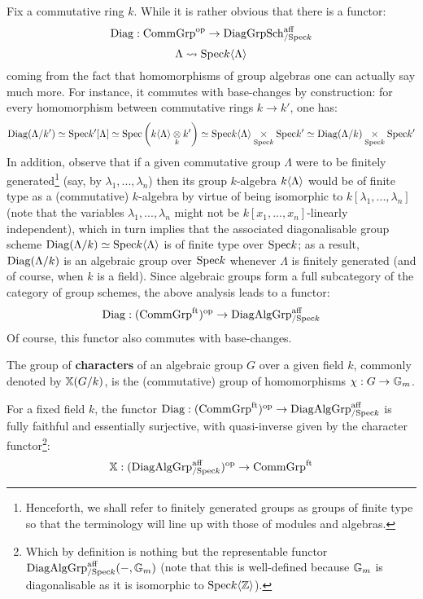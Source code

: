             \begin{remark} \label{remark: diagonalisable_algebraic_groups}
                Fix a commutative ring $k$. While it is rather obvious that there is a functor:
                    $$\mathrm{Diag}: \mathrm{Comm}\mathrm{Grp}^{\mathrm{op}} \to \mathrm{Diag}\mathrm{Grp}\mathrm{Sch}^{\mathrm{aff}}_{/\mathrm{Spec} k}$$
                    $$\Lambda \leadsto \mathrm{Spec} k\langle\Lambda\rangle$$
                coming from the fact that homomorphisms of group algebras one can actually say much more. For instance, it commutes with base-changes by construction: for every homomorphism between commutative rings $k \to k'$, one has:
                    $$\Diag(\Lambda/k') \cong \Spec k'[\Lambda] \cong \Spec \left(k\<\Lambda\> \tensor_k k'\right) \cong \Spec k\<\Lambda\> \x_{\Spec k} \Spec k' \cong \Diag(\Lambda/k) \x_{\Spec k} \Spec k'$$
                In addition, observe that if a given commutative group $\Lambda$ were to be finitely generated\footnote{Henceforth, we shall refer to finitely generated groups as groups of finite type so that the terminology will line up with those of modules and algebras.} (say, by $\lambda_1, ..., \lambda_n$) then its group $k$-algebra $k\langle\Lambda\rangle$ would be of finite type as a (commutative) $k$-algebra by virtue of being isomorphic to $k[\lambda_1, ..., \lambda_n]$ (note that the variables $\lambda_1, ..., \lambda_n$ might not be $k[x_1, ..., x_n]$-linearly independent), which in turn implies that the associated diagonalisable group scheme $\mathrm{Diag}(\Lambda/k) \simeq \mathrm{Spec} k\langle\Lambda\rangle$ is of finite type over $\mathrm{Spec} k$; as a result, $\mathrm{Diag}(\Lambda/k)$ is an algebraic group over $\mathrm{Spec} k$ whenever $\Lambda$ is finitely generated (and of course, when $k$ is a field). Since algebraic groups form a full subcategory of the category of group schemes, the above analysis leads to a functor:
                    $$\mathrm{Diag}: (\mathrm{Comm}\mathrm{Grp}^{\mathrm{ft}})^{\mathrm{op}} \to \mathrm{Diag}\mathrm{Alg}\mathrm{Grp}^{\mathrm{aff}}_{/\mathrm{Spec} k}$$
                Of course, this functor also commutes with base-changes. 
            \end{remark}
            \begin{definition}[Characters] \label{def: characters_of_algebraic_groups}
                The group of \textbf{characters} of an algebraic group $G$ over a given field $k$, commonly denoted by $\mathbb{X}(G/k)$, is the (commutative) group of homomorphisms $\chi: G \to \mathbb{G}_m$.
            \end{definition}
            \begin{proposition} \label{prop: pontryagin_duality_for_algebraic_groups}
                For a fixed field $k$, the functor $\mathrm{Diag}: (\mathrm{Comm}\mathrm{Grp}^{\mathrm{ft}})^{\mathrm{op}} \to \mathrm{Diag}\mathrm{Alg}\mathrm{Grp}^{\mathrm{aff}}_{/\mathrm{Spec} k}$ is fully faithful and essentially surjective, with quasi-inverse given by the character functor\footnote{Which by definition is nothing but the representable functor $\mathrm{Diag}\mathrm{Alg}\mathrm{Grp}^{\mathrm{aff}}_{/\mathrm{Spec} k}(-, \mathbb{G}_m)$ (note that this is well-defined because $\mathbb{G}_m$ is diagonalisable as it is isomorphic to $\mathrm{Spec} k\langle\mathbb{Z}\rangle$).}:
                    $$\mathbb{X}: (\mathrm{Diag}\mathrm{Alg}\mathrm{Grp}^{\mathrm{aff}}_{/\mathrm{Spec} k})^{\mathrm{op}} \to \mathrm{Comm}\mathrm{Grp}^{\mathrm{ft}}$$
            \end{proposition}

